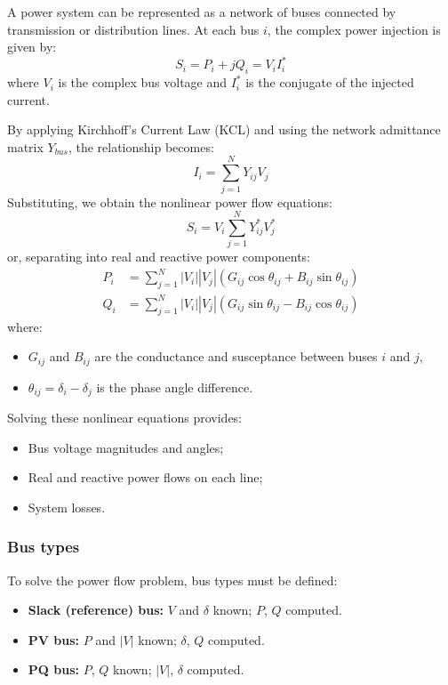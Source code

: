 \documentclass[11pt]{article}
\begin{document}
	A power system can be represented as a network of buses connected by transmission or distribution lines.  
	At each bus $i$, the complex power injection is given by:
	\[
	S_i = P_i + jQ_i = V_i I_i^*
	\]
	where $V_i$ is the complex bus voltage and $I_i^*$ is the conjugate of the injected current.
	
	By applying Kirchhoff’s Current Law (KCL) and using the network admittance matrix $Y_{bus}$, the relationship becomes:
	\[
	I_i = \sum_{j=1}^N Y_{ij} V_j
	\]
	Substituting, we obtain the nonlinear power flow equations:
	\[
	S_i = V_i \sum_{j=1}^N Y_{ij}^* V_j^*
	\]
	or, separating into real and reactive power components:
	\[
	\begin{aligned}
		P_i &= \sum_{j=1}^N |V_i||V_j| \left( G_{ij} \cos\theta_{ij} + B_{ij} \sin\theta_{ij} \right) \\
		Q_i &= \sum_{j=1}^N |V_i||V_j| \left( G_{ij} \sin\theta_{ij} - B_{ij} \cos\theta_{ij} \right)
	\end{aligned}
	\]
	where:
	\begin{itemize}
		\item $G_{ij}$ and $B_{ij}$ are the conductance and susceptance between buses $i$ and $j$,
		\item $\theta_{ij} = \delta_i - \delta_j$ is the phase angle difference.
	\end{itemize}
	
	Solving these nonlinear equations provides:
	\begin{itemize}
		\item Bus voltage magnitudes and angles;
		\item Real and reactive power flows on each line;
		\item System losses.
	\end{itemize}
	
	\subsubsection*{Bus types}
	
	To solve the power flow problem, bus types must be defined:
	\begin{itemize}
		\item \textbf{Slack (reference) bus:} $V$ and $\delta$ known; $P$, $Q$ computed.
		\item \textbf{PV bus:} $P$ and $|V|$ known; $\delta$, $Q$ computed.
		\item \textbf{PQ bus:} $P$, $Q$ known; $|V|$, $\delta$ computed.
	\end{itemize}
	
\end{document}
